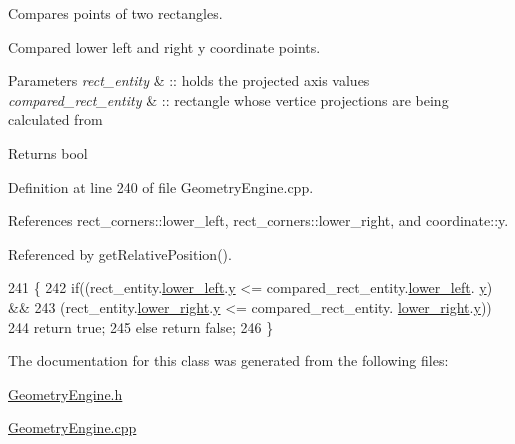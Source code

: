 Compares points of two rectangles. 

Compared lower left and right y coordinate points. 
\begin{DoxyParams}{Parameters}
{\em rect\-\_\-entity} & \-:\-: holds the projected axis values \\
\hline
{\em compared\-\_\-rect\-\_\-entity} & \-:\-: rectangle whose vertice projections are being calculated from \\
\hline
\end{DoxyParams}
\begin{DoxyReturn}{Returns}
bool 
\end{DoxyReturn}


Definition at line 240 of file Geometry\-Engine.\-cpp.



References rect\-\_\-corners\-::lower\-\_\-left, rect\-\_\-corners\-::lower\-\_\-right, and coordinate\-::y.



Referenced by get\-Relative\-Position().


\begin{DoxyCode}
241 \{
242     \textcolor{keywordflow}{if}((rect\_entity.\hyperlink{structrect__corners_a2960e4888d6a9621429044e426950bc8}{lower\_left}.\hyperlink{structcoordinate_ad48911206c84b1a8306a7023900ff622}{y} <= compared\_rect\_entity.\hyperlink{structrect__corners_a2960e4888d6a9621429044e426950bc8}{lower\_left}.
      \hyperlink{structcoordinate_ad48911206c84b1a8306a7023900ff622}{y}) &&
243        (rect\_entity.\hyperlink{structrect__corners_aa499428b9c692d61e1b43d059156a5af}{lower\_right}.\hyperlink{structcoordinate_ad48911206c84b1a8306a7023900ff622}{y} <= compared\_rect\_entity.
      \hyperlink{structrect__corners_aa499428b9c692d61e1b43d059156a5af}{lower\_right}.\hyperlink{structcoordinate_ad48911206c84b1a8306a7023900ff622}{y}))
244             \textcolor{keywordflow}{return} \textcolor{keyword}{true};
245     \textcolor{keywordflow}{else} \textcolor{keywordflow}{return} \textcolor{keyword}{false};
246 \}
\end{DoxyCode}


The documentation for this class was generated from the following files\-:\begin{DoxyCompactItemize}
\item 
\hyperlink{GeometryEngine_8h}{Geometry\-Engine.\-h}\item 
\hyperlink{GeometryEngine_8cpp}{Geometry\-Engine.\-cpp}\end{DoxyCompactItemize}
